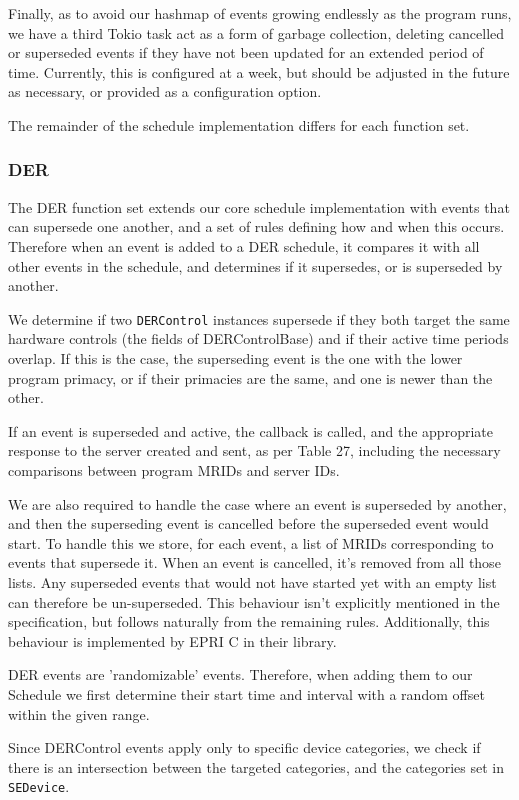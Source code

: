 Finally, as to avoid our hashmap of events growing endlessly as the program runs, we have a third Tokio task act as a form of garbage collection, deleting cancelled or superseded events if they have not been updated for an extended period of time. Currently, this is configured at a week, but should be adjusted in the future as necessary, or provided as a configuration option.

The remainder of the schedule implementation differs for each function set.

\subsubsection{DER}
The DER function set extends our core schedule implementation with events that can supersede one another, and a set of rules defining how and when this occurs. Therefore when an event is added to a DER schedule, it compares it with all other events in the schedule, and determines if it supersedes, or is superseded by another. 

We determine if two \texttt{DERControl} instances supersede if they both target the same hardware controls (the fields of DERControlBase) and if their active time periods overlap. If this is the case, the superseding event is the one with the lower program primacy, or if their primacies are the same, and one is newer than the other.

If an event is superseded and active, the callback is called, and the appropriate response to the server created and sent, as per Table 27, including the necessary comparisons between program MRIDs and server IDs.

We are also required to handle the case where an event is superseded by another, and then the superseding event is cancelled before the superseded event would start. To handle this we store, for each event, a list of MRIDs corresponding to events that supersede it. When an event is cancelled, it's removed from all those lists. Any superseded events that would not have started yet with an empty list can therefore be un-superseded.
This behaviour isn't explicitly mentioned in the specification, but follows naturally from the remaining rules. Additionally, this behaviour is implemented by EPRI C in their library.

DER events are 'randomizable' events. Therefore, when adding them to our Schedule we first determine their start time and interval with a random offset within the given range.

Since DERControl events apply only to specific device categories, we check if there is an intersection between the targeted categories, and the categories set in \texttt{SEDevice}.

